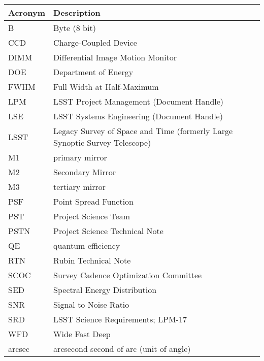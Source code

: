 \addtocounter{table}{-1}
\begin{longtable}{p{}p{}}\hline
\textbf{Acronym} & \textbf{Description}  \\\hline

B & Byte (8 bit) \\\hline
CCD & Charge-Coupled Device \\\hline
DIMM & Differential Image Motion Monitor \\\hline
DOE & Department of Energy \\\hline
FWHM & Full Width at Half-Maximum \\\hline
LPM & LSST Project Management (Document Handle) \\\hline
LSE & LSST Systems Engineering (Document Handle) \\\hline
LSST & Legacy Survey of Space and Time (formerly Large Synoptic Survey Telescope) \\\hline
M1 & primary mirror \\\hline
M2 & Secondary Mirror \\\hline
M3 & tertiary mirror \\\hline
PSF & Point Spread Function \\\hline
PST & Project Science Team \\\hline
PSTN & Project Science Technical Note \\\hline
QE & quantum efficiency \\\hline
RTN & Rubin Technical Note \\\hline
SCOC & Survey Cadence Optimization Committee \\\hline
SED & Spectral Energy Distribution \\\hline
SNR & Signal to Noise Ratio \\\hline
SRD & LSST Science Requirements; LPM-17 \\\hline
WFD & Wide Fast Deep \\\hline
arcsec & arcsecond second of arc (unit of angle) \\\hline
\end{longtable}
